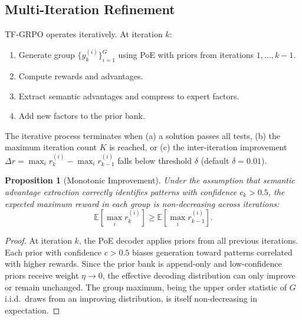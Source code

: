 \documentclass[11pt]{article}
\newtheorem{proposition}[theorem]{Proposition}
\begin{document}
\subsection{Multi-Iteration Refinement}

TF-GRPO operates iteratively. At iteration $k$:
\begin{enumerate}[leftmargin=1.5em]
    \item Generate group $\{y^{(i)}_k\}_{i=1}^G$ using PoE with priors from
          iterations $1, \ldots, k-1$.
    \item Compute rewards and advantages.
    \item Extract semantic advantages and compress to expert factors.
    \item Add new factors to the prior bank.
\end{enumerate}

The iterative process terminates when (a) a solution passes all tests, (b) the
maximum iteration count $K$ is reached, or (c) the inter-iteration improvement
$\Delta r = \max_i r_k^{(i)} - \max_i r_{k-1}^{(i)}$ falls below threshold
$\delta$ (default $\delta = 0.01$).

\begin{proposition}[Monotonic Improvement]
\label{prop:monotonic}
Under the assumption that semantic advantage extraction correctly identifies
patterns with confidence $c_k > 0.5$, the expected maximum reward in each group
is non-decreasing across iterations:
\begin{equation}
    \mathbb{E}\left[\max_i r_k^{(i)}\right] \geq \mathbb{E}\left[\max_i r_{k-1}^{(i)}\right].
\end{equation}
\end{proposition}

\begin{proof}
At iteration $k$, the PoE decoder applies priors from all previous iterations.
Each prior with confidence $c > 0.5$ biases generation toward patterns
correlated with higher rewards. Since the prior bank is append-only and
low-confidence priors receive weight $\eta \to 0$, the effective decoding
distribution can only improve or remain unchanged. The group maximum, being the
upper order statistic of $G$ i.i.d.\ draws from an improving distribution, is
itself non-decreasing in expectation.
\end{proof}

\end{document}
